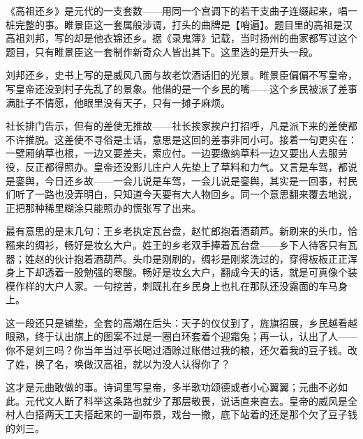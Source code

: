 \begin{appreciation}
《高祖还乡》是元代的一支套数——用同一个宫调下的若干支曲子连缀起来，唱一桩完整的事。睢景臣这一套属般涉调，打头的曲牌是【哨遍】。题目里的高祖是汉高祖刘邦，写的却是他衣锦还乡。据《录鬼簿》记载，当时扬州的曲家都写过这个题目，只有睢景臣这一套制作新奇众人皆出其下。这里选的是开头一段。

刘邦还乡，史书上写的是威风八面与故老饮酒话旧的光景。睢景臣偏偏不写皇帝，写皇帝还没到村子先乱了的景象。他借的是一个乡民的嘴——这个乡民被派了差事满肚子不情愿，他眼里没有天子，只有一摊子麻烦。

社长排门告示，但有的差使无推故——社长挨家挨户打招呼，凡是派下来的差使都不许推脱。这差使不寻俗是土话，意思是这回的差事非同小可。接着一句更实在：一壁厢纳草也根，一边又要差夫，索应付。一边要缴纳草料一边又要出人去服劳役，反正都得照办。皇帝还没影儿庄户人先垫上了草料和力气。又言是车驾，都说是銮舆，今日还乡故——一会儿说是车驾，一会儿说是銮舆，其实是一回事，村民们听了一路也没弄明白，只知道今天要有大人物回乡。同一个意思翻来覆去地说，正把那种稀里糊涂只能照办的慌张写了出来。

最有意思的是末几句：王乡老执定瓦台盘，赵忙郎抱着酒葫芦。新刷来的头巾，恰糨来的绸衫，畅好是妆幺大户。姓王的乡老双手捧着瓦台盘——乡下人待客只有瓦器；姓赵的伙计抱着酒葫芦。头巾是刚刷的，绸衫是刚浆洗过的，穿得板板正正浑身上下却透着一股勉强的寒酸。畅好是妆幺大户，翻成今天的话，就是可真像个装模作样的大户人家。一句挖苦，刺既扎在乡民身上也扎在那队还没露面的车马身上。

这一段还只是铺垫，全套的高潮在后头：天子的仪仗到了，旌旗招展，乡民越看越眼熟，终于认出旗上的图案不过是一圈白环套着个迎霜兔；再一认，认出了人——你不是刘三吗？你当年当过亭长喝过酒赊过账借过我的粮，还欠着我的豆子钱。改了姓，换了名，唤做汉高祖，就以为没人认得你了？

这才是元曲敢做的事。诗词里写皇帝，多半歌功颂德或者小心翼翼；元曲不必如此。元代文人断了科举这条路也就少了那层敬畏，说话直来直去。皇帝的威风是全村人白搭两天工夫搭起来的一副布景，戏台一撤，底下站着的还是那个欠了豆子钱的刘三。
\end{appreciation}

